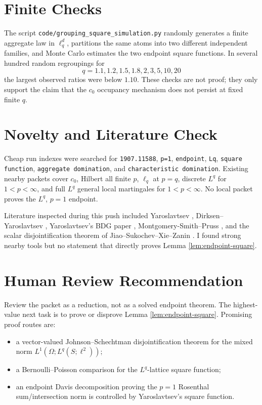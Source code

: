 \documentclass[11pt]{article}
\begin{document}
\section*{Finite Checks}

The script \texttt{code/grouping\_square\_simulation.py} randomly generates a
finite aggregate law in \(\ell_q^d\), partitions the same atoms into two
different independent families, and Monte Carlo estimates the two endpoint
square functions.  In several hundred random regroupings for
\[
q=1.1,1.2,1.5,1.8,2,3,5,10,20
\]
the largest observed ratios were below \(1.10\).  These checks are not proof;
they only support the claim that the \(c_0\) occupancy mechanism does not
persist at fixed finite \(q\).

\section*{Novelty and Literature Check}

Cheap run indexes were searched for \texttt{1907.11588}, \texttt{p=1},
\texttt{endpoint}, \texttt{Lq}, \texttt{square function},
\texttt{aggregate domination}, and \texttt{characteristic domination}.  Existing
nearby packets cover \(c_0\), Hilbert all finite \(p\), \(\ell_q\) at \(p=q\),
discrete \(L^q\) for \(1<p<\infty\), and full \(L^q\) general local martingales
for \(1<p<\infty\).  No local packet proves the \(L^q\), \(p=1\) endpoint.

Literature inspected during this push included Yaroslavtsev
\cite{Yaroslavtsev2019}, Dirksen--Yaroslavtsev
\cite{DirksenYaroslavtsev2017}, Yaroslavtsev's BDG paper
\cite{Yaroslavtsev2018}, Montgomery-Smith--Pruss
\cite{MontgomerySmithPruss1998}, and the scalar disjointification theorem of
Jiao--Sukochev--Xie--Zanin \cite{JiaoSukochevXieZanin2019}.  I found strong
nearby tools but no statement that directly proves Lemma
\ref{lem:endpoint-square}.

\section*{Human Review Recommendation}

Review the packet as a reduction, not as a solved endpoint theorem.  The
highest-value next task is to prove or disprove Lemma \ref{lem:endpoint-square}.
Promising proof routes are:
\begin{itemize}
\item a vector-valued Johnson--Schechtman disjointification theorem for the
mixed norm \(L^1(\Omega;L^q(S;\ell^2))\);
\item a Bernoulli--Poisson comparison for the \(L^q\)-lattice square function;
\item an endpoint Davis decomposition proving the \(p=1\) Rosenthal
sum/intersection norm is controlled by Yaroslavtsev's square function.
\end{itemize}
\end{document}
